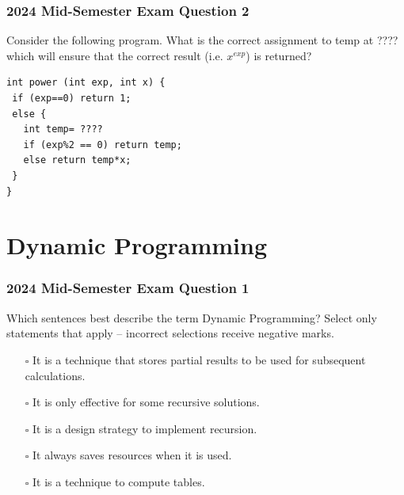 \documentclass[twoside=false,DIV=14]{scrartcl}
\begin{document}
 

\section{2024 Mid-Semester Exam Question 2}
Consider the following program. What is the correct assignment to temp at ???? which will ensure that the correct result (i.e. $x^{exp}$) is returned?
\begin{lstlisting}
int power (int exp, int x) {
 if (exp==0) return 1;
 else {
   int temp= ????
   if (exp%2 == 0) return temp;
   else return temp*x;
 }
}  
\end{lstlisting}
 


%  

\newpage\setcounter{section}{0}
\part*{Dynamic Programming}

\section{2024 Mid-Semester Exam Question 1}
Which sentences best describe the term Dynamic Programming?  Select only statements that apply -- incorrect selections receive negative marks.
\begin{enumerate}
\item[$\square$] It is a technique that stores partial results to be used for subsequent calculations.
\item[$\square$] It is only effective for some recursive solutions.
\item[$\square$] It is a design strategy to implement recursion.
\item[$\square$] It always saves resources when it is used.
\item[$\square$] It is a technique to compute tables.
\end{enumerate}
\end{document}
